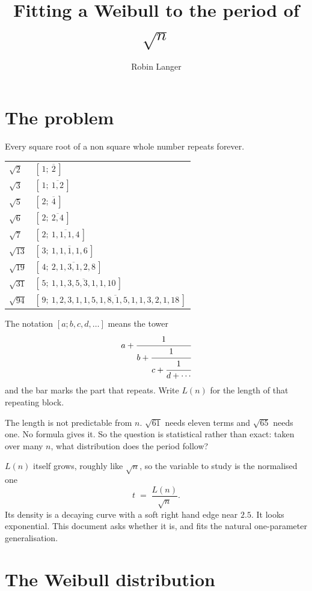 \documentclass[12pt,a4paper]{article}
\title{Fitting a Weibull to the period of $\sqrt{n}$}
\author{Robin Langer}
\date{}
\begin{document}
\maketitle
\vspace{-1.5em}

\section{The problem}

Every square root of a non square whole number repeats forever.

\begin{center}
\begin{tabular}{ll}
\toprule
$\sqrt{2}$  & $[\,1;\ \overline{2}\,]$ \\
$\sqrt{3}$  & $[\,1;\ \overline{1,2}\,]$ \\
$\sqrt{5}$  & $[\,2;\ \overline{4}\,]$ \\
$\sqrt{6}$  & $[\,2;\ \overline{2,4}\,]$ \\
$\sqrt{7}$  & $[\,2;\ \overline{1,1,1,4}\,]$ \\
$\sqrt{13}$ & $[\,3;\ \overline{1,1,1,1,6}\,]$ \\
$\sqrt{19}$ & $[\,4;\ \overline{2,1,3,1,2,8}\,]$ \\
$\sqrt{31}$ & $[\,5;\ \overline{1,1,3,5,3,1,1,10}\,]$ \\
$\sqrt{94}$ & $[\,9;\ \overline{1,2,3,1,1,5,1,8,1,5,1,1,3,2,1,18}\,]$ \\
\bottomrule
\end{tabular}
\end{center}

The notation $[a; b, c, d, \ldots]$ means the tower
\[
  a + \cfrac{1}{b + \cfrac{1}{c + \cfrac{1}{d + \cdots}}}
\]
and the bar marks the part that repeats. Write $L(n)$ for the length of that repeating block.

The length is not predictable from $n$. $\sqrt{61}$ needs eleven terms and $\sqrt{65}$ needs one. No formula gives it. So the question is statistical rather than exact: taken over many $n$, what distribution does the period follow?

$L(n)$ itself grows, roughly like $\sqrt{n}$, so the variable to study is the normalised one
\[
  t \;=\; \frac{L(n)}{\sqrt{n}} .
\]
Its density is a decaying curve with a soft right hand edge near $2.5$. It looks exponential. This document asks whether it is, and fits the natural one-parameter generalisation.

\section{The Weibull distribution}
\end{document}
